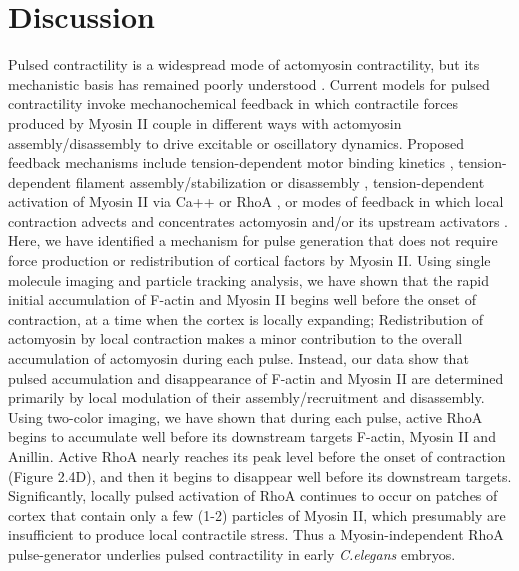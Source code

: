 \documentclass{ucetd}
\begin{document}
\section{Discussion}
Pulsed contractility is a widespread mode of actomyosin contractility, but its mechanistic basis has remained poorly understood \cite{Levayer:2012bu, Gorfinkiel:2016bv}. Current models for pulsed contractility invoke mechanochemical feedback in which contractile forces produced by Myosin II couple in different ways with actomyosin assembly/disassembly to drive excitable or oscillatory dynamics. Proposed feedback mechanisms include tension-dependent motor binding kinetics \cite{Ren:2009ep, Effler:2006hc, He:2010gf, Luo:2012bl}, tension-dependent filament assembly/stabilization \cite{Hayakawa:2011dq, DeLaCruz:2015dj} or disassembly \cite{Machado:2014fx}, tension-dependent activation of Myosin II via Ca++ \cite{Kapustina:2008ds} or RhoA \cite{Koride:2014hp}, or modes of feedback in which local contraction advects and concentrates actomyosin and/or its upstream activators \cite{Bois:2011kx, Kumar:2014ux, Munjal:2015bx}.  Here, we have identified a mechanism for pulse generation that does not require force production or redistribution of cortical factors by Myosin II.  Using single molecule imaging and particle tracking analysis, we have shown that the rapid initial accumulation of F-actin and Myosin II begins well before the onset of contraction, at a time when the cortex is locally expanding; Redistribution of actomyosin by local contraction makes a minor contribution to the overall accumulation of actomyosin during each pulse.  Instead, our data show that pulsed accumulation and disappearance of F-actin and Myosin II are determined primarily by local modulation of their assembly/recruitment and disassembly. Using two-color imaging, we have shown that during each pulse, active RhoA begins to accumulate well before its downstream targets F-actin, Myosin II and Anillin. Active RhoA nearly reaches its peak level before the onset of contraction (Figure 2.4D), and then it begins to disappear well before its downstream targets. Significantly, locally pulsed activation of RhoA continues to occur on patches of cortex that contain only a few (1-2) particles of Myosin II, which presumably are insufficient to produce local contractile stress. Thus a Myosin-independent RhoA pulse-generator underlies pulsed contractility in early \textit{C.elegans} embryos.
\end{document}
